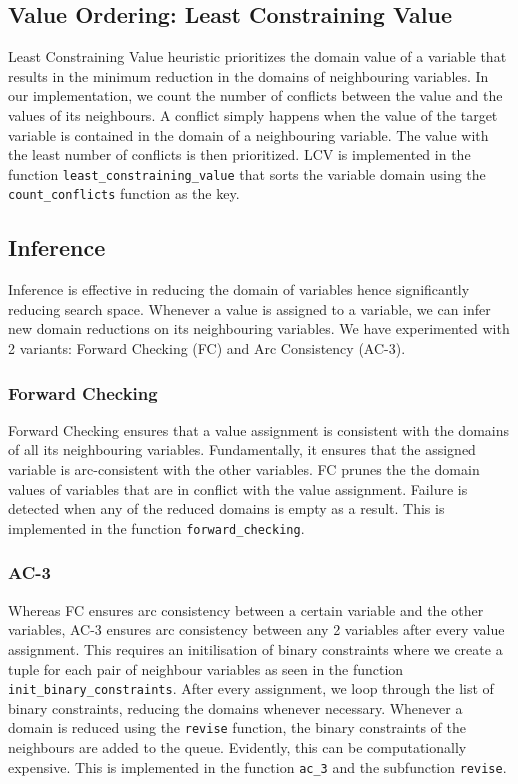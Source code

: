 \documentclass[9.5pt]{extarticle}
\begin{document}
\subsection{Value Ordering: Least Constraining Value}

Least Constraining Value heuristic prioritizes the domain value of a variable that results in the minimum reduction in the domains of neighbouring variables. In our implementation, we count the number of conflicts between the value and the values of its neighbours. A conflict simply happens when the value of the target variable is contained in the domain of a neighbouring variable. The value with the least number of conflicts is then prioritized. LCV is implemented in the function \verb`least_constraining_value` that sorts the variable domain using the \verb`count_conflicts` function as the key.


\subsection{Inference}

Inference is effective in reducing the domain of variables hence significantly reducing search space. Whenever a value is assigned to a variable, we can infer new domain reductions on its neighbouring variables. We have experimented with 2 variants: Forward Checking (FC) and Arc Consistency (AC-3). 


\subsubsection{Forward Checking}

Forward Checking ensures that a value assignment is consistent with the domains of all its neighbouring variables. Fundamentally, it ensures that the assigned variable is arc-consistent with the other variables. FC prunes the the domain values of variables that are in conflict with the value assignment. Failure is detected when any of the reduced domains is empty as a result. This is implemented in the function \verb`forward_checking`.

\subsubsection{AC-3}

Whereas FC ensures arc consistency between a certain variable and the other variables, AC-3 ensures arc consistency between any 2 variables after every value assignment. This requires an initilisation of binary constraints where we create a tuple for each pair of neighbour variables as seen in the function \verb`init_binary_constraints`. After every assignment, we loop through the list of binary constraints, reducing the domains whenever necessary. Whenever a domain is reduced using the \verb`revise` function, the binary constraints of the neighbours are added to the queue. Evidently, this can be computationally expensive. This is implemented in the function  \verb`ac_3` and the subfunction \verb`revise`. 
\end{document}
